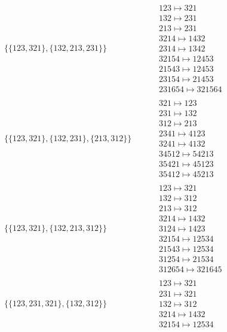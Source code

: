 \begin{tiny}
\begin{align}
\begin{matrix}
\end{matrix}
\\
\{\{123, 321\}, \{132, 213, 231\}\}
\quad
&
\phantom{.}
&
\begin{matrix}
123 \mapsto 321\\132 \mapsto 231\\213 \mapsto 231\\3214 \mapsto 1432\\2314 \mapsto 1342\\32154 \mapsto 12453\\21543 \mapsto 12453\\23154 \mapsto 21453\\231654 \mapsto 321564
\end{matrix}
\\
\{\{123, 321\}, \{132, 231\}, \{213, 312\}\}
\quad
&
\phantom{.}
&
\begin{matrix}
321 \mapsto 123\\231 \mapsto 132\\312 \mapsto 213\\2341 \mapsto 4123\\3241 \mapsto 4132\\34512 \mapsto 54213\\35421 \mapsto 45123\\35412 \mapsto 45213
\end{matrix}
\\
\{\{123, 321\}, \{132, 213, 312\}\}
\quad
&
\phantom{.}
&
\begin{matrix}
123 \mapsto 321\\132 \mapsto 312\\213 \mapsto 312\\3214 \mapsto 1432\\3124 \mapsto 1423\\32154 \mapsto 12534\\21543 \mapsto 12534\\31254 \mapsto 21534\\312654 \mapsto 321645
\end{matrix}
\\
\{\{123, 231, 321\}, \{132, 312\}\}
\quad
&
\phantom{.}
&
\begin{matrix}
123 \mapsto 321\\231 \mapsto 321\\132 \mapsto 312\\3214 \mapsto 1432\\32154 \mapsto 12534
\end{matrix}
\\

\end{align}
\end{tiny}
